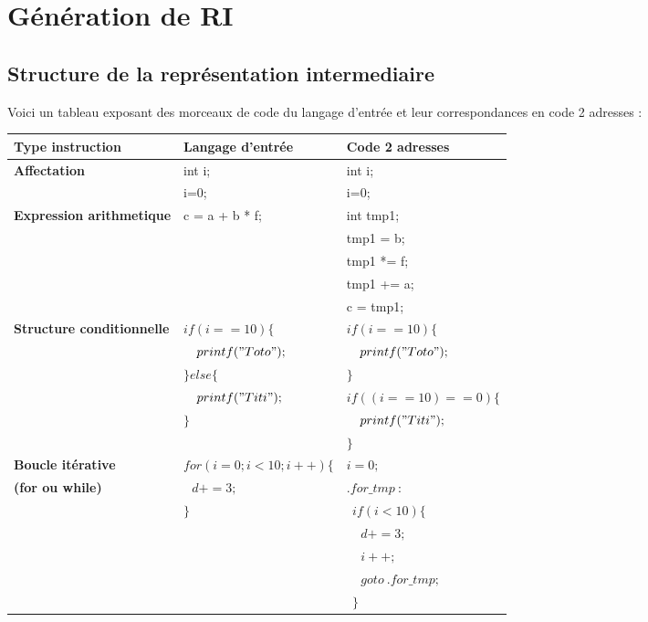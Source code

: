 \newpage
\section{Génération de RI}
\subsection{Structure de la représentation intermediaire}

Voici un tableau exposant des morceaux de code du langage d'entrée et leur correspondances en code 2 adresses : \\

\begin{tabular}{|l|l|l|}
  \hline
  \textbf{Type instruction} & \textbf{Langage d'entrée} & \textbf{Code 2 adresses} \\
  \hline
  \textbf{Affectation} & int i; & int i; \tabularnewline
    & i=0; & i=0; \tabularnewline
  \hline
   \textbf{Expression arithmetique} & c = a + b * f; & int tmp1; \tabularnewline
   & & tmp1 = b; \tabularnewline
   & & tmp1 *= f; \tabularnewline
   & & tmp1 += a; \tabularnewline
   & & c = tmp1; \tabularnewline
  \hline
  \textbf{Structure conditionnelle} & \raggedleft $if(i==10)\{$ & $if(i==10)\{$ \tabularnewline
  & $\ \ \ printf("Toto");$ & \raggedleft $\ \ \ printf("Toto");$ \tabularnewline
  & $\} else \{$ & \raggedleft $\}$ \tabularnewline
  & $\ \ \ printf("Titi");$ & \raggedleft $if((i==10)== 0)\{$ \tabularnewline
  & $\} $ & \raggedleft $\ \ \ printf("Titi");$ \tabularnewline
  & & \raggedleft $\}$ \tabularnewline
  \hline
  \textbf{Boucle itérative} & \raggedleft $for(i=0; i<10; i++)\{$ & $i = 0;$ \tabularnewline
  \textbf{(for ou while)} & $\ \ \ d += 3;$ & \raggedleft $.for\_tmp\ :$ \tabularnewline
  & $\}$ & \raggedleft $\ \ if(i<10)\{$ \tabularnewline
  & & \raggedleft $\ \ \ \ \ d += 3;$ \tabularnewline
  & & \raggedleft $\ \ \ \ \ i++;$ \tabularnewline
  & & \raggedleft $\ \ \ \ \ goto\ .for\_tmp;$  \tabularnewline
  & & \raggedleft $\ \ \}$ \tabularnewline
  \hline
\end{tabular}

